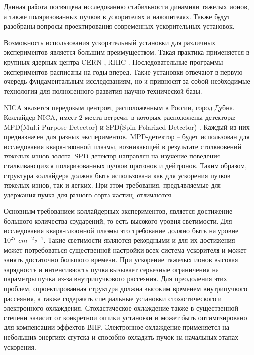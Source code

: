 \par Данная работа посвящена исследованию стабильности динамики тяжелых ионов, а также поляризованных пучков в ускорителях и накопителях. Также будут разобраны вопросы проектирования современных ускорительных установок.

\par Возможность использования ускорительный установки для различных экспериментов является большим преимуществом. Такая практика применяется в крупных ядерных центра CERN \cite{lhc:heavy_ions}, RHIC \cite{rhic:design}. Последовательные программы экспериментов расписаны на годы вперед. Такие установки отвечают в первую очередь фундаментальным исследованиям, но и привносят за собой необходимые технологии для полноценного развития научно-технической базы.

\par NICA является передовым центром, расположенным в России, город Дубна. Коллайдер NICA, имеет 2 места встречи, в которых расположены детектора: MPD(Multi-Purpose Detector) \cite{MPD} и SPD(Spin Polarized Detector) \cite{Ladygin:SPD}. Каждый из них предназначен для разных экспериментов. MPD-детектор – будет использован для исследования кварк-гюонной плазмы, возникающей в результате столкновений тяжелых ионов золота. SPD-детектор направлен на изучение поведения сталкивающихся поляризованных пучков протонов и дейтронов. Таким образом, структура коллайдера должна быть использована как для ускорения пучков тяжелых ионов, так и легких. При этом требования, предъявляемые для удержания пучка для разного сорта частиц, отличаются. 

\par Основным требованием коллайдерных экспериментов, является достижение большого количества соударений, то есть высокого уровня светимости. Для исследования кварк-глюонной плазмы это требование должно быть на уровне $10^{27}$ $cm^{-2}s^{-1}$. Такие светимости являются рекордными и для их достижения может потребоваться существенной настройки всех система ускорителя и может занять достаточно большого времени. При ускорение тяжелых ионов высокая зарядность и интенсивность пучка вызывает серьезные ограничения на параметры пучка из-за внутрипучкового рассеяния. Для преодоления этих проблем, спроектированная структура должна высоким временем внутрипучкого рассеяния, а также содержать специальные установки стохастического и электронного охлаждения. Стохастическое охлаждение также в существенной степени зависит от конкретной оптики установки и может быть оптимизировано для компенсации эффектов ВПР. Электронное охлаждение применяется на небольших энергиях сгутска и способно охладить пучок на начальных этапах ускорения.

